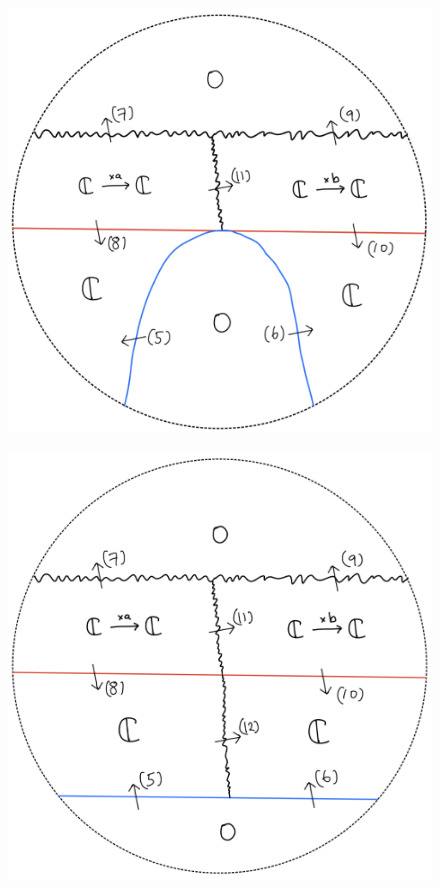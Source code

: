 \begin{figure}[H]
    \centering
    \includegraphics[scale = 0.95]{diagrams/lemma2/43.png} 
    \caption{}
    \label{fig:your-label}
\end{figure}
\begin{figure}[H]
    \centering
    \includegraphics[scale = 0.95]{diagrams/lemma2/44.png} 
    \caption{}
    \label{fig:your-label}
\end{figure}
